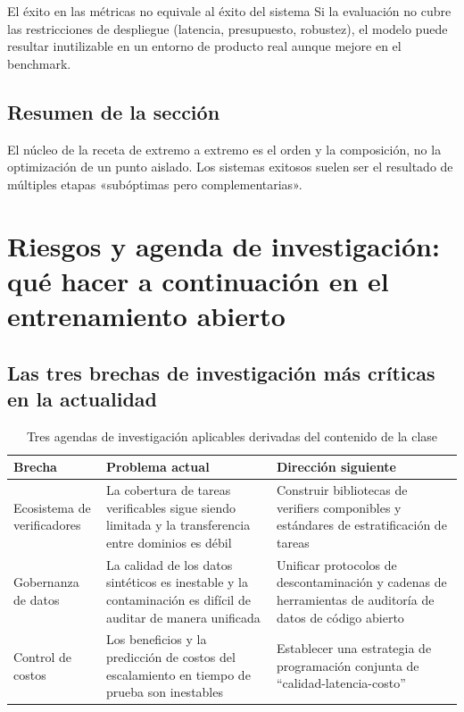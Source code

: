 \documentclass[a4paper]{article}
\begin{document}
\begin{warningbox}{El éxito en las métricas no equivale al éxito del sistema}
Si la evaluación no cubre las restricciones de despliegue (latencia, presupuesto, robustez), el modelo puede resultar inutilizable en un entorno de producto real aunque mejore en el benchmark.
\end{warningbox}

\subsection{Resumen de la sección}
El núcleo de la receta de extremo a extremo es el orden y la composición, no la optimización de un punto aislado. Los sistemas exitosos suelen ser el resultado de múltiples etapas «subóptimas pero complementarias».


\section{Riesgos y agenda de investigación: qué hacer a continuación en el entrenamiento abierto}

\subsection{Las tres brechas de investigación más críticas en la actualidad}
\begin{table}[H]
\centering
\renewcommand{\arraystretch}{1.2}
\begin{tabular}{p{3.0cm}p{4.0cm}p{4.2cm}}
\toprule
\textbf{Brecha} & \textbf{Problema actual} & \textbf{Dirección siguiente} \\
\midrule
Ecosistema de verificadores & La cobertura de tareas verificables sigue siendo limitada y la transferencia entre dominios es débil & Construir bibliotecas de verifiers componibles y estándares de estratificación de tareas \\
Gobernanza de datos & La calidad de los datos sintéticos es inestable y la contaminación es difícil de auditar de manera unificada & Unificar protocolos de descontaminación y cadenas de herramientas de auditoría de datos de código abierto \\
Control de costos & Los beneficios y la predicción de costos del escalamiento en tiempo de prueba son inestables & Establecer una estrategia de programación conjunta de ``calidad-latencia-costo'' \\
\bottomrule
\end{tabular}
\caption{Tres agendas de investigación aplicables derivadas del contenido de la clase}
\end{table}
\end{document}
